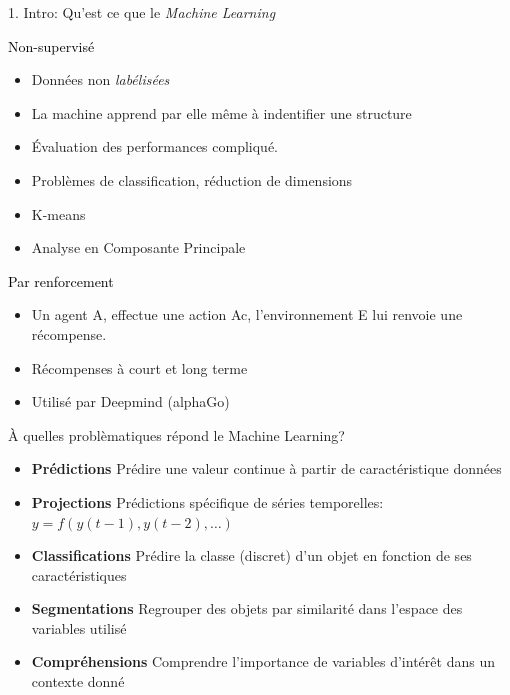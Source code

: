 \begin{frame}{1. Intro: Qu'est ce que le \textit{Machine Learning}}
  \begin{minipage}{.5\textwidth}
    \begin{beamerboxesrounded}[scheme=suppervise,width=0.95\textwidth]{\textcolor{black}{Non-supervisé}}
      \begin{itemize}
        \tiny
      \item Données non \textit{labélisées}
      \item La machine apprend par elle même à indentifier une structure
      \item Évaluation des performances compliqué.
      \item Problèmes de classification, réduction de dimensions
      \item K-means
      \item Analyse en Composante Principale
      \end{itemize}
    \end{beamerboxesrounded}
  \end{minipage}
  \hfill
  \begin{minipage}{.5\textwidth}
    \begin{beamerboxesrounded}[scheme=suppervise,width=0.95\textwidth]{\textcolor{black}{Par renforcement}}
      \vspace{0.5cm}
      \begin{itemize}
        \tiny
      \item Un agent A, effectue une action Ac, l'environnement E lui renvoie une récompense.
      \item Récompenses à court et long terme
      \item Utilisé par Deepmind (alphaGo)
      \end{itemize}
      \vspace{0.5cm}
    \end{beamerboxesrounded}
  \end{minipage}  
\end{frame}

\begin{frame}{À quelles problèmatiques répond le Machine Learning?}
  \begin{itemize}
  \item \textcolor{orangeAgaetis}{\textbf{Prédictions}} Prédire une valeur continue à partir de caractéristique données
  \item \textcolor{orangeAgaetis}{\textbf{Projections}} Prédictions spécifique de séries temporelles: $y = f(y(t-1), y(t-2), \dots)$
  \item \textcolor{orangeAgaetis}{\textbf{Classifications}} Prédire la classe (discret) d'un objet en fonction de ses caractéristiques
  \item \textcolor{orangeAgaetis}{\textbf{Segmentations}} Regrouper des objets par similarité dans l'espace des variables utilisé
  \item \textcolor{orangeAgaetis}{\textbf{Compréhensions}} Comprendre l'importance de variables d'intérêt dans un contexte donné
  \end{itemize}
\end{frame}
